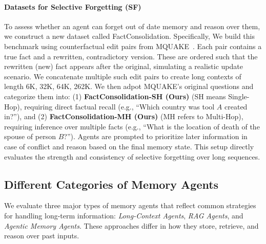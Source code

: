 \paragraph{Datasets for Selective Forgetting (SF)}
To assess whether an agent can forget out of date memory and reason over them, we construct a new dataset called FactConsolidation. Specifically, We build this benchmark using counterfactual edit pairs from \textsc{MQUAKE}~\citep{mquake}. Each pair contains a true fact and a rewritten, contradictory version. These are ordered such that the rewritten (new) fact appears after the original, simulating a realistic update scenario. We concatenate multiple such edit pairs to create long contexts of length {6K, 32K, 64K, 262K}. We then adpot MQUAKE’s original questions and categorize them into: (1) \textbf{FactConsolidation-SH (Ours)} (SH means Single-Hop), requiring direct factual recall (e.g., “Which country was tool $A$ created in?”), and (2) \textbf{FactConsolidation-MH (Ours)} (MH refers to Multi-Hop), requiring inference over multiple facts (e.g., “What is the location of death of the spouse of person $B$?”). 
Agents are prompted to prioritize later information in case of conflict and reason based on the final memory state. This setup directly evaluates the strength and consistency of selective forgetting over long sequences.



\subsection{Different Categories of Memory Agents}
\label{sub:various_memory_agents}

We evaluate three major types of memory agents that reflect common strategies for handling long-term information: \emph{Long-Context Agents}, \emph{RAG Agents}, and \emph{Agentic Memory Agents}. These approaches differ in how they store, retrieve, and reason over past inputs. 

